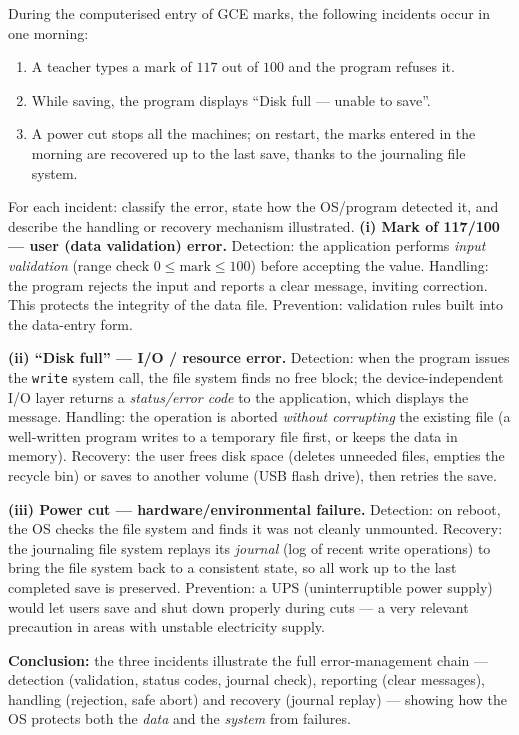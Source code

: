 \documentclass[11pt]{article}
\newcommand{\cle}[1]{{\popxbold\color{popdark}#1}}
\begin{document}
\begin{exoresolu}
During the computerised entry of GCE marks, the following incidents occur in one morning:
\begin{enumerate}
\item[(i)] A teacher types a mark of $117$ out of $100$ and the program refuses it.
\item[(ii)] While saving, the program displays ``Disk full — unable to save''.
\item[(iii)] A power cut stops all the machines; on restart, the marks entered in the morning are recovered up to the last save, thanks to the journaling file system.
\end{enumerate}
For each incident: classify the error, state how the OS/program detected it, and describe the handling or recovery mechanism illustrated.
\tcblower
\textbf{(i) Mark of 117/100 — user (data validation) error.} Detection: the application performs \emph{input validation} (range check $0 \le \text{mark} \le 100$) before accepting the value. Handling: the program rejects the input and reports a clear message, inviting correction. This protects the \cle{integrity} of the data file. Prevention: validation rules built into the data-entry form.

\textbf{(ii) ``Disk full'' — I/O / resource error.} Detection: when the program issues the \texttt{write} system call, the file system finds no free block; the device-independent I/O layer returns a \emph{status/error code} to the application, which displays the message. Handling: the operation is aborted \emph{without corrupting} the existing file (a well-written program writes to a temporary file first, or keeps the data in memory). Recovery: the user frees disk space (deletes unneeded files, empties the recycle bin) or saves to another volume (USB flash drive), then retries the save.

\textbf{(iii) Power cut — hardware/environmental failure.} Detection: on reboot, the OS checks the file system and finds it was not cleanly unmounted. Recovery: the \cle{journaling file system} replays its \emph{journal} (log of recent write operations) to bring the file system back to a consistent state, so all work up to the last completed save is preserved. Prevention: a UPS (uninterruptible power supply) would let users save and shut down properly during cuts — a very relevant precaution in areas with unstable electricity supply.

\textbf{Conclusion:} the three incidents illustrate the full error-management chain — detection (validation, status codes, journal check), reporting (clear messages), handling (rejection, safe abort) and recovery (journal replay) — showing how the OS protects both the \emph{data} and the \emph{system} from failures.
\end{exoresolu}
\end{document}
